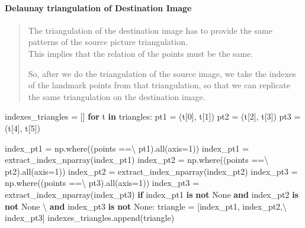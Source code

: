 \documentclass[12pt, a4paper, twocolumn]{article}
\newenvironment{Shaded}{}{}
\newcommand{\KeywordTok}[1]{\textcolor[rgb]{0.00,0.44,0.13}{\textbf{#1}}}
\newcommand{\DecValTok}[1]{\textcolor[rgb]{0.25,0.63,0.44}{#1}}
\newcommand{\VariableTok}[1]{\textcolor[rgb]{0.10,0.09,0.49}{#1}}
\newcommand{\ControlFlowTok}[1]{\textcolor[rgb]{0.00,0.44,0.13}{\textbf{#1}}}
\newcommand{\OperatorTok}[1]{\textcolor[rgb]{0.40,0.40,0.40}{#1}}
\newcommand{\BuiltInTok}[1]{#1}
\newcommand{\NormalTok}[1]{#1}
\let\oldparagraph\paragraph
\renewcommand{\paragraph}[1]{\oldparagraph{#1}\mbox{}}
\begin{document}
\paragraph{Delaunay triangulation of Destination
	Image}\label{header-n156}

\begin{quote}
	The triangulation of the destination image has to provide the same
	patterns of the source picture triangulation.\\
	This implies that the relation of the points must be the same.
	
	So, after we do the triangulation of the source image, we take the
	indexes of the landmark points from that triangulation, so that we can
	replicate the same triangulation on the destination image.
\end{quote}

\begin{Shaded}
\small
\begin{Highlighting}[]
\NormalTok{indexes_triangles }\OperatorTok{=}\NormalTok{ []}
\ControlFlowTok{for}\NormalTok{ t }\KeywordTok{in}\NormalTok{ triangles:}
\NormalTok{    pt1 }\OperatorTok{=}\NormalTok{ (t[}\DecValTok{0}\NormalTok{], t[}\DecValTok{1}\NormalTok{])}
\NormalTok{    pt2 }\OperatorTok{=}\NormalTok{ (t[}\DecValTok{2}\NormalTok{], t[}\DecValTok{3}\NormalTok{])}
\NormalTok{    pt3 }\OperatorTok{=}\NormalTok{ (t[}\DecValTok{4}\NormalTok{], t[}\DecValTok{5}\NormalTok{])}\OperatorTok{}
\NormalTok{}
\NormalTok{    index_pt1 }\OperatorTok{=}\NormalTok{ np.where((points }\OperatorTok{==}\OperatorTok{\textbackslash{}}
\NormalTok{}\NormalTok{ pt1).}\BuiltInTok{all}\NormalTok{(axis}\OperatorTok{=}\DecValTok{1}\NormalTok{))}
\NormalTok{    index_pt1 }\OperatorTok{=}\NormalTok{ extract_index_nparray(index_pt1)}
\NormalTok{    index_pt2 }\OperatorTok{=}\NormalTok{ np.where((points }\OperatorTok{==}\OperatorTok{\textbackslash{}}
\NormalTok{}\NormalTok{ pt2).}\BuiltInTok{all}\NormalTok{(axis}\OperatorTok{=}\DecValTok{1}\NormalTok{))}
\NormalTok{    index_pt2 }\OperatorTok{=}\NormalTok{ extract_index_nparray(index_pt2)}
\NormalTok{    index_pt3 }\OperatorTok{=}\NormalTok{ np.where((points }\OperatorTok{==}\OperatorTok{\textbackslash{}}
\NormalTok{}\NormalTok{ pt3).}\BuiltInTok{all}\NormalTok{(axis}\OperatorTok{=}\DecValTok{1}\NormalTok{))}
\NormalTok{    index_pt3 }\OperatorTok{=}\NormalTok{ extract_index_nparray(index_pt3)}
\ControlFlowTok{if}\NormalTok{ index_pt1 }\KeywordTok{is} \KeywordTok{not} \VariableTok{None} \KeywordTok{and}\NormalTok{ index_pt2 }\KeywordTok{is} \KeywordTok{not} \VariableTok{None} \OperatorTok{\textbackslash{}}
\KeywordTok{and}\NormalTok{ index_pt3 }\KeywordTok{is} \KeywordTok{not} \VariableTok{None}\NormalTok{:}
\NormalTok{        triangle }\OperatorTok{=}\NormalTok{ [index_pt1, index_pt2,}\OperatorTok{\textbackslash{}}
\NormalTok{ index_pt3]}
\NormalTok{        indexes_triangles.append(triangle)}
\end{Highlighting}
\end{Shaded}
\end{document}
